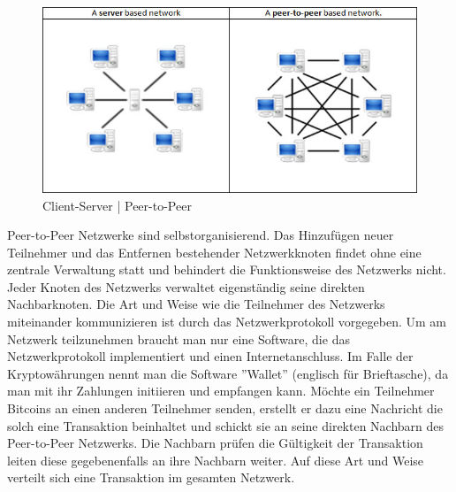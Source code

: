 \begin{figure}[H]
\centering
\includegraphics[width=1\linewidth]{Figures/p2p_networks}
\decoRule
\caption{Client-Server | Peer-to-Peer \cite{wikipedia_p2p}}
\label{fig:p2p_networks}
\end{figure}

Peer-to-Peer Netzwerke sind selbstorganisierend. Das Hinzufügen neuer Teilnehmer und das Entfernen bestehender Netzwerkknoten findet ohne eine zentrale Verwaltung statt und behindert die Funktionsweise des Netzwerks nicht. Jeder Knoten des Netzwerks verwaltet eigenständig seine direkten Nachbarknoten. Die Art und Weise wie die Teilnehmer des Netzwerks miteinander kommunizieren ist durch das Netzwerkprotokoll vorgegeben. Um am Netzwerk teilzunehmen braucht man nur eine Software, die das Netzwerkprotokoll implementiert und einen Internetanschluss. Im Falle der Kryptowährungen nennt man die Software ''Wallet'' (englisch für Brieftasche), da man mit ihr Zahlungen initiieren und empfangen kann. Möchte ein Teilnehmer Bitcoins an einen anderen Teilnehmer senden, erstellt er dazu eine Nachricht die solch eine Transaktion beinhaltet und schickt sie an seine direkten Nachbarn des Peer-to-Peer Netzwerks. Die Nachbarn prüfen die Gültigkeit der Transaktion leiten diese gegebenenfalls an ihre Nachbarn weiter. Auf diese Art und Weise verteilt sich eine Transaktion im gesamten Netzwerk.


